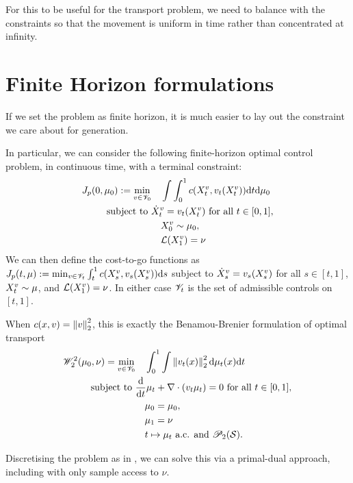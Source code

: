 \documentclass[twoside,10pt]{../jmlr}
\begin{document}
For this to be useful for the transport problem, we need to balance with the constraints so that the movement is uniform in time rather than concentrated at infinity.


\section{Finite Horizon formulations}

If we set the problem as finite horizon, it is much easier to lay out the constraint we care about for generation.

In particular, we can consider the following finite-horizon optimal control problem, in continuous time, with a terminal constraint:
\begin{align}
    J_p(0,\mu_0):=\min_{v\in\mathscr{V}_0}&\quad \int\int_0^1 c(X_t^v,v_t(X_t^v))\mathrm{d} t\mathrm{d} \mu_0\notag\\
    \mbox{ subject to }& \dot X_t^v=v_t(X_t^v) \mbox{ for all } t\in[0,1],\\
    &\quad X_0^v\sim\mu_0,\notag\\
    &\quad \mathcal{L}(X_1^v)=\nu\notag
\end{align}
We can then define the cost-to-go functions as $J_p(t,\mu):=\min_{v\in\mathscr{V}_t}\int_t^1 c(X_s^v,v_s(X_s^v))\mathrm{d} s$ subject to $\dot X_s^v=v_s(X_s^v)$ for all $s\in[t,1]$, $X_t^v\sim\mu$, and $\mathcal{L}(X_1^v)=\nu$.
In either case $\mathscr{V}_t$ is the set of admissible controls on $[t,1]$. 

When $c(x,v)=\left\lVert v\right\rVert^2_2$, this is exactly the Benamou-Brenier formulation of optimal transport
\begin{align}
\mathscr{W}_2^2(\mu_0,\nu)=\min_{v\in\mathscr{V}_0}&\quad \int_0^1 \int \left\lVert v_t(x)\right\rVert^2_2\mathrm{d} \mu_t(x)\mathrm{d} t\\
    \mbox{ subject to }& \frac{\mathrm{d}}{\mathrm{d} t}\mu_t+\nabla\cdot(v_t\mu_t)=0 \mbox{ for all } t\in[0,1],\\
    &\quad \mu_0=\mu_0,\notag\\
    &\quad \mu_1=\nu\notag\\
    &\quad t\mapsto\mu_t \mbox{ a.c. and } \mathscr{P}_2(\mathcal{S}).
\end{align} 


Discretising the problem as in \citet{PDRLOT}, we can solve this via a primal-dual approach, including with only sample access to $\nu$. 
\end{document}
